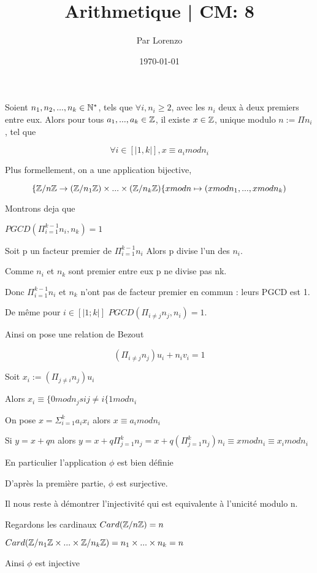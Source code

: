 \documentclass[a4paper, 12pt]{article}
\title{Arithmetique | CM: 8}
\author{Par Lorenzo}
\date{\today}
\begin{document}
\maketitle

\begin{theorem}
    Soient $n_1, n_2, ..., n_k \in \mathbb{N}^*$, tels que $\forall i, n_i \geq 2$, avec les $n_i$ deux à deux premiers entre eux.
    Alors pour tous $a_1, ..., a_k \in \mathbb{Z}$, il existe $x \in \mathbb{Z}$, unique modulo
    $n := \Pi n_i$, tel que

    $$
        \forall i \in [|1, k|], x \equiv a_i mod n_i
    $$

    Plus formellement, on a une application bijective,

    $$
    \{ \mathbb{Z}/n\mathbb{Z} \to (\mathbb{Z}/n_1\mathbb{Z}) \times ... \times (\mathbb{Z}/n_k\mathbb{Z})
    \{ x mod n \mapsto (x mod n_1, ..., x mod n_k)
    $$
\end{theorem}

\begin{demonstration}
    Montrons deja que

    $PGCD(\Pi_{i=1}^{k-1} n_i, n_k) = 1$

    Soit p un facteur premier de $\Pi_{i=1}^{k-1} n_i$
    Alors p divise l'un des $n_i$.

    Comme $n_i$ et $n_k$ sont premier entre eux p ne divise pas nk.

    Donc $\Pi_{i=1}^{k-1} n_i$ et $n_k$ n'ont pas de facteur premier en commun : leurs PGCD est 1.

    De même pour $i \in [|1;k|]$ $PGCD(\Pi_{i\neq j} n_j, n_i) = 1$.

    Ainsi on pose une relation de Bezout

    $$
        (\Pi_{i\neq j} n_j) u_i + n_i v_i = 1
    $$

    Soit $x_i := (\Pi_{j \neq i} n_j)u_i$

    Alors $x_i \equiv \{ 0 mod n_j si j \neq i \{ 1 mod n_i$

    On pose $x = \Sigma_{i=1}^k a_i x_i$ alors $x \equiv a_i mod n_i$

    Si $y = x + qn$ alors $y = x + q \Pi_{j=1}^k n_j = x + q(\Pi_{j=1}^k n_j) n_i \equiv x mod n_i \equiv x_i mod n_i$

    En particulier l'application $\phi$ est bien définie

    D'après la première partie, $\phi$ est surjective.

    Il nous reste à démontrer l'injectivité qui est equivalente à l'unicité modulo n.

    Regardons les cardinaux $Card(\mathbb{Z}/n\mathbb{Z}) = n$

    $Card(\mathbb{Z}/n_1\mathbb{Z} \times ... \times \mathbb{Z}/n_k\mathbb{Z}) = n_1 \times ... \times n_k = n$

    Ainsi $\phi$ est injective
\end{demonstration}
\end{document}
